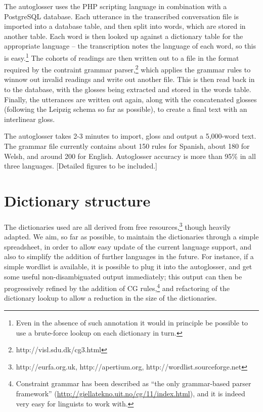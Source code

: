 \documentclass[11pt]{article}
\begin{document}
The autoglosser uses the PHP scripting language in combination with a PostgreSQL database.  Each utterance in the transcribed conversation file is imported into a database table, and then split into words, which are stored in another table.  Each word is then looked up against a dictionary table for the appropriate language -- the transcription notes the language of each word, so this is easy.\footnote{Even in the absence of such annotation it would in principle be possible to use a brute-force lookup on each dictionary in turn.}  The cohorts of readings are then written out to a file in the format required by the contraint grammar parser,\footnote{http://visl.sdu.dk/cg3.html} which applies the grammar rules to winnow out invalid readings and write out another file.  This is then read back in to the database, with the glosses being extracted and stored in the words table.  Finally, the utterances are written out again, along with the concatenated glosses (following the Leipzig schema so far as possible), to create a final text with an interlinear gloss.

The autoglosser takes 2-3 minutes to import, gloss and output a 5,000-word text.  The grammar file  currently contains about 150 rules for Spanish, about 180 for Welsh, and around 200 for English.  Autoglosser accuracy is more than 95\% in all three languages. [Detailed figures to be included.]

\section{Dictionary structure}
\label{sec:dictionary}

The dictionaries used are all derived from free resources,\footnote{http://eurfa.org.uk, http://apertium.org, http://wordlist.sourceforge.net} though heavily adapted.  We aim, so far as possible, to maintain the dictionaries through a simple spreadsheet, in order to allow easy update of the current language support, and also to simplify the addition of further languages in the future.  For instance, if a simple wordlist is available, it is possible to plug it into the autoglosser, and get some useful non-disambiguated output immediately; this output can then be progressively refined by the addition of CG rules,\footnote{Constraint grammar has been described as ``the only grammar-based parser framework'' (\url{http://giellatekno.uit.no/cg/11/index.html}), and it is indeed very easy for linguists to work with.} and refactoring of the dictionary lookup to allow a reduction in the size of the dictionaries. 
\end{document}

